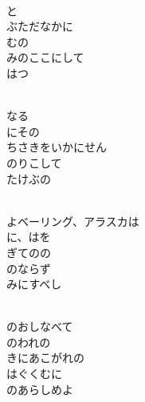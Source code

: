 \documentclass[10pt,b5j]{tarticle} %
\begin{document}
\vspace{1.5em} %
\newcommand{\linespace}{0.5em} %
\newcommand{\blocksize}{0.5\hsize} %
\newcommand{\itemmargin}{6em} %
\begin{enumerate} %
    \setlength{\itemindent}{\itemmargin} %
    \begin{minipage}[c]{\blocksize}
    
        \vspace{\linespace}
        \item~\\
        と\\
        ぶただなかに\\
        むの\\
        みのここにして\\
        はつ
        
        \vspace{\linespace}
        \item~\\
        なる\\
        にその\\
        ちさきをいかにせん\\
        のりこして\\
        たけぶの
        
        \vspace{\linespace}
        \item~\\
        よベーリング、アラスカは\\
        に、はを\\
        ぎてのの\\
        のならず\\
        みにすべし
        
        \vspace{\linespace}
        \item~\\
        のおしなべて\\
        のわれの\\
        きにあこがれの\\
        はぐくむに\\
        のあらしめよ
    
    \end{minipage}
\end{enumerate} %
\end{document}
